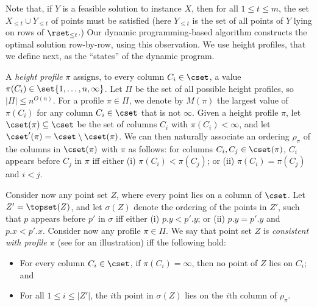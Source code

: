 Note that, if $Y$ is a feasible solution to instance $X$, then for all $1\leq t\leq m$, the set $X_{\leq t}\cup Y_{\leq t}$ of points must be satisfied (here $Y_{\leq t}$ is the set of all points of $Y$ lying on rows of $\rset_{\leq t}$.) Our dynamic programming-based algorithm constructs the optimal solution row-by-row, using this observation. We use height profiles, that we define next, as the ``states'' of the dynamic program.

 
%


A \emph{height profile} $\pi$ assigns, to every column $C_i\in \cset$, a value $\pi(C_i)\in \set{1,\ldots,n,\infty}$. Let $\Pi$ be the set of all possible height profiles, so $|\Pi|\leq n^{O(n)}$. For a profile $\pi\in \Pi$, we denote by $M(\pi)$ the largest value of $\pi(C_i)$ for any column $C_i\in \cset$ that is not $\infty$. Given a height profile $\pi$, let $\cset(\pi)\subseteq \cset$ be the set of columns $C_i$ with $\pi(C_i)<\infty$, and let $\cset'(\pi)=\cset\setminus\cset(\pi)$. We can then naturally associate an ordering $\rho_{\pi}$ of the columns in $\cset(\pi)$ with $\pi$ as follows: for columns $C_i,C_j\in \cset(\pi)$, $C_i$ appears before $C_j$ in $\pi$ iff either  (i) $\pi(C_i)<\pi(C_{j})$; or (ii) $\pi(C_i)=\pi(C_{j})$ and $i<j$.

Consider now any point set $Z$, where every point lies on a column of $\cset$. Let $Z'=\topset(Z)$, and let $\sigma(Z)$ denote the ordering of the points in $Z'$, such that $p$ appears before $p'$ in $\sigma$ iff either (i) $p.y<p'.y$; or (ii) $p.y=p'.y$ and $p.x<p'.x$. 
Consider now any profile  $\pi\in \Pi$.
We say that point set $Z$ is \emph{consistent with profile $\pi$} (see  for an illustration) iff the following hold:

\begin{itemize}
	\item For every column $C_i\in \cset$, if $\pi(C_i)=\infty$, then no point of $Z$ lies on $C_i$; and
	\item For all $1\leq i\leq |Z'|$, the $i$th point in $\sigma(Z)$ lies on the $i$th column of $\rho_{\pi}$.
\end{itemize}


